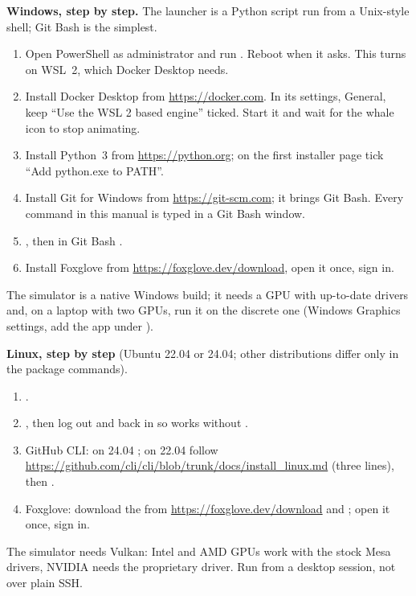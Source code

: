 \documentclass[11pt,a4paper]{article}
\begin{document}
\medskip
\textbf{Windows, step by step.} The launcher is a Python script run from a Unix-style shell;
Git Bash is the simplest.
\begin{enumerate}[leftmargin=*]
  \item Open PowerShell as administrator and run . Reboot when it asks. This
  turns on WSL~2, which Docker Desktop needs.
  \item Install Docker Desktop from \url{https://docker.com}. In its settings, General, keep
  ``Use the WSL 2 based engine'' ticked. Start it and wait for the whale icon to stop animating.
  \item Install Python~3 from \url{https://python.org}; on the first installer page tick
  ``Add python.exe to PATH''.
  \item Install Git for Windows from \url{https://git-scm.com}; it brings Git Bash. Every
   command in this manual is typed in a Git Bash window.
  \item {}, then in Git Bash .
  \item Install Foxglove from \url{https://foxglove.dev/download}, open it once, sign in.
\end{enumerate}
The simulator is a native Windows build; it needs a GPU with up-to-date drivers and, on a
laptop with two GPUs, run it on the discrete one (Windows Graphics settings, add the app under
).

\medskip
\textbf{Linux, step by step} (Ubuntu 22.04 or 24.04; other distributions differ only in the
package commands).
\begin{enumerate}[leftmargin=*]
  \item {}.
  \item {}, then log out and back in so  works
  without .
  \item GitHub CLI: on 24.04 ; on 22.04 follow
  \url{https://github.com/cli/cli/blob/trunk/docs/install_linux.md} (three lines), then
  .
  \item Foxglove: download the  from \url{https://foxglove.dev/download} and
  ; open it once, sign in.
\end{enumerate}
The simulator needs Vulkan: Intel and AMD GPUs work with the stock Mesa drivers, NVIDIA needs
the proprietary driver. Run from a desktop session, not over plain SSH.
\end{document}
